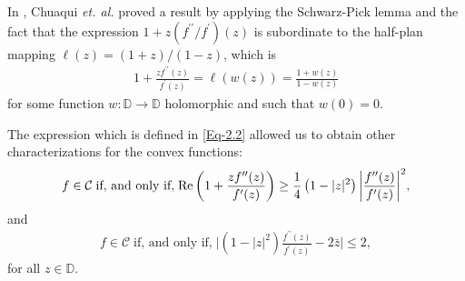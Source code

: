 \documentclass[a4paper,12pt]{amsart}
\theoremstyle{plain}
\theoremstyle{definition}
\theoremstyle{plain}
\begin{document}
In \cite{Chuaqui-Duren-Osgood-AASFM-2011}, Chuaqui \emph{et. al.} proved a result by applying the Schwarz-Pick lemma and the fact that the expression $1+z(f^{\prime\prime}/f^{\prime})(z)$ is subordinate to the half-plan mapping $\ell(z)=(1+z)/(1-z)$, which is 
\begin{align}\label{Eq-2.2}
	1+\frac{zf^{\prime\prime}(z)}{f^{\prime}(z)}=\ell(w(z))=\frac{1+w(z)}{1-w(z)}
\end{align}
for some function $w : \mathbb{D}\to\mathbb{D}$ holomorphic and such that $w(0)=0$. \vspace{2mm}

The expression which is defined in \eqref{Eq-2.2} allowed us to obtain other characterizations for the convex functions: 
\begin{align}\label{Eq-22.3}
	f\in\mathcal{C}\; \mbox{if, and only if,}\; {\rm Re}\left(1+\frac{zf^{\prime\prime}(z)}{f^{\prime}(z)} \right)\geq \frac{1}{4}\left( 1-|z|^2\right)\bigg| \frac{f^{\prime\prime}(z)}{f^{\prime}(z)}  \bigg|^2,
\end{align}
and 
\begin{align}\label{Eq-22.4}
	f\in\mathcal{C}\; \mbox{if, and only if,}\; \bigg|\left(1-|z|^2\right)\frac{f^{\prime\prime}(z)}{f^{\prime}(z)} -2\bar{z} \bigg|\leq 2,
\end{align}
for all $z\in\mathbb{D}$.\vspace{2mm}
\end{document}
